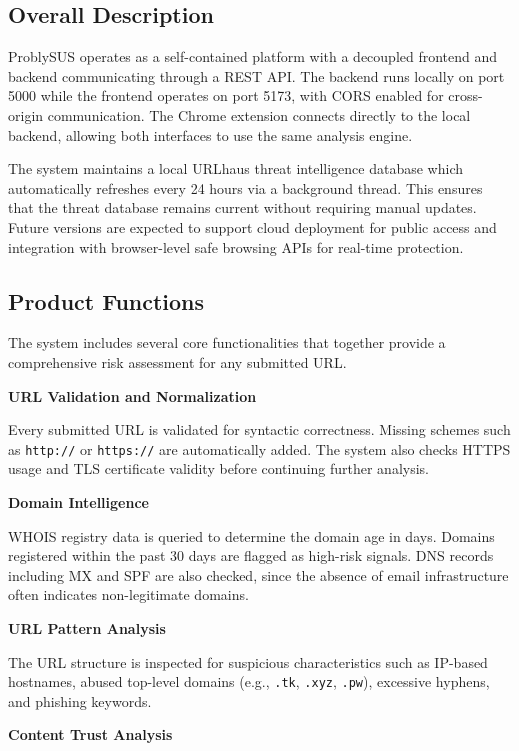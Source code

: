 \subsection{Overall Description}

ProblySUS operates as a self-contained platform with a decoupled frontend and backend communicating through a REST API. The backend runs locally on port 5000 while the frontend operates on port 5173, with CORS enabled for cross-origin communication. The Chrome extension connects directly to the local backend, allowing both interfaces to use the same analysis engine.

The system maintains a local URLhaus threat intelligence database which automatically refreshes every 24 hours via a background thread. This ensures that the threat database remains current without requiring manual updates. Future versions are expected to support cloud deployment for public access and integration with browser-level safe browsing APIs for real-time protection.

\subsection{Product Functions}

The system includes several core functionalities that together provide a comprehensive risk assessment for any submitted URL.

\textbf{URL Validation and Normalization}

Every submitted URL is validated for syntactic correctness. Missing schemes such as \texttt{http://} or \texttt{https://} are automatically added. The system also checks HTTPS usage and TLS certificate validity before continuing further analysis.

\textbf{Domain Intelligence}

WHOIS registry data is queried to determine the domain age in days. Domains registered within the past 30 days are flagged as high-risk signals. DNS records including MX and SPF are also checked, since the absence of email infrastructure often indicates non-legitimate domains.

\textbf{URL Pattern Analysis}

The URL structure is inspected for suspicious characteristics such as IP-based hostnames, abused top-level domains (e.g., \texttt{.tk}, \texttt{.xyz}, \texttt{.pw}), excessive hyphens, and phishing keywords.

\textbf{Content Trust Analysis}

